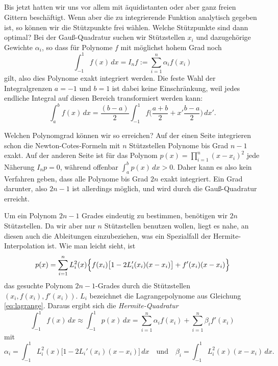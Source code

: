 \subsection{}

Bis jetzt hatten wir uns vor allem mit äquidistanten oder aber ganz
freien Gittern beschäftigt. Wenn aber die zu integrierende Funktion
analytisch gegeben ist, so können wir die Stützpunkte frei
wählen. Welche Stützpunkte sind dann optimal? Bei der Gauß-Quadratur
suchen wir Stützstellen $x_i$ und dazugehörige Gewichte $\alpha_i$, so
dass für Polynome $f$ mit möglichst hohem Grad noch
\begin{equation}
  \int_{-1}^1 f(x)\, dx = I_n f := \sum_{i=1}^n \alpha_i f(x_i)
\end{equation}
gilt, also dies Polynome exakt integriert werden. Die feste Wahl der
Integralgrenzen $a=-1$ und $b=1$ ist dabei keine Einschränkung, weil
jedes endliche Integral auf diesen Bereich transformiert werden kann:
\begin{equation}
  \int_a^b f(x)\, dx = \frac{(b-a)}{2} \int_{-1}^{1}f\bigl(
  \frac{a+b}{2} + x'\frac{b-a}{2}\bigr)\, dx'.
\end{equation}

Welchen Polynomgrad können wir so erreichen?  Auf der einen Seite
integrieren schon die Newton-Cotes-Formeln mit $n$ Stützstellen
Polynome bis Grad $n-1$ exakt. Auf der anderen Seite ist für das
Polynom $p(x) = \prod_{i=1}^n (x-x_i)^2$ jede Näherung $I_n p = 0$,
während offenbar $\int_{a}^{b} p(x)\,dx>0$. Daher kann es also kein
Verfahren geben, dass alle Polynome bis Grad $2n$ exakt
integriert. Ein Grad darunter, also $2n-1$ ist allerdings möglich, und
wird durch die Gauß-Quadratur erreicht.

Um ein Polynom $2n-1$ Grades eindeutig zu bestimmen, benötigen wir
$2n$ Stützstellen. Da wir aber nur $n$ Stützstellen benutzen wollen,
liegt es nahe, an diesen auch die Ableitungen einzubeziehen, was ein
Spezialfall der Hermite-Interpolation ist. Wie man leicht sieht, ist
\begin{equation}
  p(x) = \sum_{i=1}^n L_i^2(x)\Bigl\{f(x_i)\bigl[1-2L_i'(x_i)(x-x_i)\bigr] +
    f'(x_i)(x-x_i)\Bigr\}
\end{equation}
das gesuchte Polynom $2n-1$-Grades durch die Stützstellen $(x_i,
f(x_i), f'(x_i))$. $L_i$ bezeichnet die Lagrangepolynome aus Gleichung
\eqref{eq:lagrange}. Daraus ergibt sich die \emph{Hermite-Quadratur}
\begin{equation}
  \int_{-1}^1 f(x)\, dx \approx \int_{-1}^1 p(x)\, dx =
  \sum_{i=1}^{n} \alpha_i f(x_i) + \sum_{i=1}^{n} \beta_i f'(x_i)
\end{equation}
mit
\begin{equation}
  \alpha_i = \int_{-1}^1 L_i^2(x)\bigl[1-2L_i'(x_i)(x-x_i)\bigr]\,dx
  \quad\text{und}\quad
  \beta_i = \int_{-1}^1 L_i^2(x)(x-x_i)\, dx.
\end{equation}


